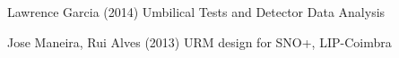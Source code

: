 \documentclass[paper=a4, fontsize=11pt]{scrartcl}
\numberwithin{equation}{section}		%
\numberwithin{figure}{section}			%
\numberwithin{table}{section}				%
\begin{document}
\begin{thebibliography}{99} %
 Lawrence Garcia (2014)
\newblock Umbilical Tests and Detector Data Analysis


 Jose Maneira, Rui Alves (2013)
\newblock URM design for SNO+, LIP-Coimbra

\end{thebibliography}


\end{document}
